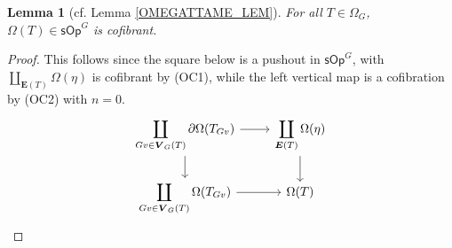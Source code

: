 \documentclass[a4paper,10pt
,draft
]{article}%
\numberwithin{equation}{section}
\numberwithin{figure}{section}
\newtheorem{lemma}[equation]{Lemma}%
\theoremstyle{definition} %
\newcommand{\longto}{\longrightarrow}%
\newcommand{\Set}{\ensuremath{\mathsf{Set}}}
\newcommand{\sOp}{\ensuremath{\mathsf{sOp}}}%
\newcommand{\1}{\ensuremath{\mathbbm 1}}%
\begin{document}
\begin{lemma}[cf. Lemma \ref{OMEGATTAME_LEM}]
      For all $T \in \Omega_G$, $\Omega(T) \in \sOp^G$ is cofibrant.
\end{lemma}
\begin{proof}
      This follows since the square below is a pushout in $\sOp^G$,
      with $\coprod_{\boldsymbol{E}(T)} \Omega(\eta)$ is cofibrant by (OC1), while
      the left vertical map is a cofibration by (OC2) with $n=0$.
      \[
            \begin{tikzcd}
                  \displaystyle{
                    \coprod_{Gv \in \boldsymbol{V}_G(T)} \partial \Omega(T_{Gv})
                  }
                  \arrow[d] \arrow[r]
                  &
                  \displaystyle{
                    \coprod_{\boldsymbol{E}(T)} \Omega(\eta)
                  }
                  \arrow[d]
                  \\
                  \displaystyle{
                    \coprod_{Gv \in \boldsymbol{V}_G(T)} \Omega(T_{Gv})
                  }
                  \arrow[r]
                  &
                  \Omega(T)
            \end{tikzcd}
      \]
\end{proof}
\end{document}
